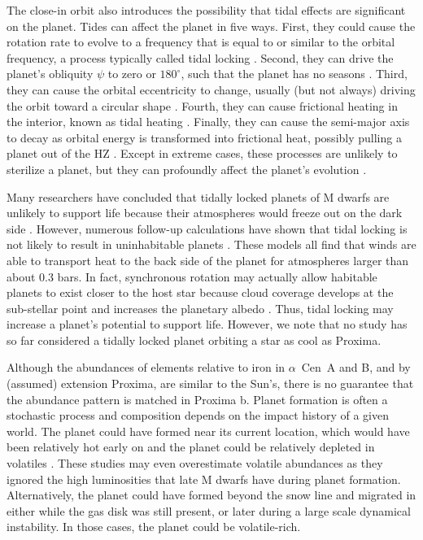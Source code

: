 \documentclass[preprint,12pt]{aastex}
\def\acen{{$\alpha$~Cen}}
\begin{document}
The close-in orbit also introduces the possibility that tidal effects
are significant on the planet. Tides can affect the planet in five
ways. First, they could cause the rotation rate to evolve to a
frequency that is equal to or similar to the orbital frequency, a
process typically called tidal locking
\citep{Dole64,Kasting93,Barnes16}. Second, they can drive the planet's
obliquity $\psi$ to zero or $180^{\circ}$, such that the planet has no seasons
\citep{Heller11}. Third, they can cause the orbital eccentricity to
change, usually (but not always) driving the orbit toward a circular
shape \citep{Darwin1880,FerrazMello08}. Fourth, they can cause
frictional heating in the interior, known as tidal heating
\citep{Peale79,Jackson08c,Barnes13}. Finally, they can cause the
semi-major axis to decay as orbital energy is transformed into
frictional heat, possibly pulling a planet out of the HZ
\citep{Darwin1880,Barnes08}. Except in extreme cases, these processes
are unlikely to sterilize a planet, but they can profoundly affect the
planet's evolution \citep{DriscollBarnes15}.

Many researchers have concluded that tidally locked planets of M
dwarfs are unlikely to support life because their atmospheres would
freeze out on the dark side \citep{Kasting93}. However, numerous
follow-up calculations have shown that tidal locking is not likely to
result in uninhabitable planets
\citep{Joshi97,Pierrehumbert11,Wordsworth11,Yang13,Shields16,Kopparapu16}. These
models all find that winds are able to transport heat to the back side
of the planet for atmospheres larger than about 0.3 bars. In fact,
synchronous rotation may actually allow habitable planets to exist
closer to the host star because cloud coverage develops at the
sub-stellar point and increases the planetary albedo
\citep{Yang13}. Thus, tidal locking may increase a planet's potential
to support life. However, we note that no study has so far considered a tidally locked planet orbiting a star as cool as Proxima.

Although the abundances of elements relative to iron in \acen~A and B,
and by (assumed) extension Proxima, are similar to the Sun's, there is no
guarantee that the abundance pattern is matched in Proxima
b. Planet formation is often a stochastic process and composition
depends on the impact history of a given world. The planet could have
formed near its current location, which would have been relatively hot
early on and the planet could be relatively depleted in volatiles
\citep{Raymond07,Mulders15}. These studies may even overestimate
volatile abundances as they ignored the high luminosities that late M
dwarfs have during planet formation. Alternatively, the planet could
have formed beyond the snow line and migrated in either while the gas
disk was still present, or later during a large scale dynamical
instability. In those cases, the planet could be
volatile-rich.
\end{document}
